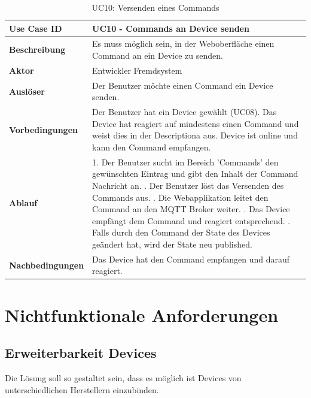 \begin{table}[H]
\begin{tabularx}{\textwidth}{|l|X|}

 \hline
 {\bf Use Case ID }    & UC10 - Commands an Device senden \\  \hline
 {\bf Beschreibung }   & Es muss möglich sein, in der Weboberfläche einen Command an ein Device zu senden. \\ \hline
 {\bf Aktor }          & Entwickler Fremdsystem \\ \hline
 {\bf Auslöser }       & Der Benutzer möchte einen Command ein Device senden. \\ \hline
 {\bf Vorbedingungen } & 
     Der Benutzer hat ein Device gewählt (UC08). \newline
     Das Device hat reagiert auf mindestens einen Command und weist dies in der Descriptiona aus. \newline 
     Device ist online und kann den Command empfangen. \\ \hline
 {\bf Ablauf }         & 
     1. Der Benutzer sucht im Bereich 'Commands' den gewünschten Eintrag und gibt den Inhalt der Command Nachricht an. \newline
     2. Der Benutzer löst das Versenden des Commands aus. \newline
     3. Die Webapplikation leitet den Command an den MQTT Broker weiter. \newline
     4. Das Device empfängt dem Command und reagiert entsprechend. \newline
     5. Falls durch den Command der State des Devices geändert hat, wird der State neu published.
     \\ \hline
 {\bf Nachbedingungen} & Das Device hat den Command empfangen und darauf reagiert. \\ \hline
  
\end{tabularx}
\caption{UC10: Versenden eines Commands}
\end{table}




\section{Nichtfunktionale Anforderungen}

\subsection{Erweiterbarkeit Devices}
Die Lösung soll so gestaltet sein, dass es möglich ist Devices von unterschiedlichen Herstellern einzubinden.

